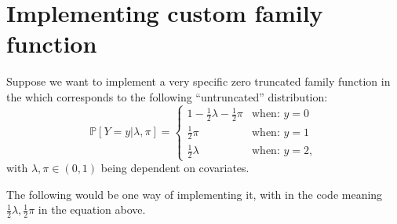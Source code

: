 \documentclass[
]{jss}
\newcommand{\1}{\mathcal{I}} \newcommand{\bZero}{\boldsymbol{0}}
\begin{document}
\clearpage

\section[Implementing custom singleRcapture family function]{Implementing
custom  family
function}\label{implementing-custom-family-function}

Suppose we want to implement a very specific zero truncated family
function in the  which corresponds to the following
``untruncated'' distribution: \begin{equation}
  \mathbb{P}[Y=y|\lambda, \pi] = \begin{cases}
    1 - \frac{1}{2}\lambda - \frac{1}{2}\pi & \text{when: } y=0\\
    \frac{1}{2}\pi & \text{when: } y=1\\
    \frac{1}{2}\lambda & \text{when: } y=2,
  \end{cases}
\end{equation} with \(\lambda, \pi\in\left(0, 1\right)\) being dependent
on covariates.

The following would be one way of implementing it, with
 in the code meaning
\(\frac{1}{2}\lambda,\frac{1}{2}\pi\) in the equation above.

\small
\end{document}
